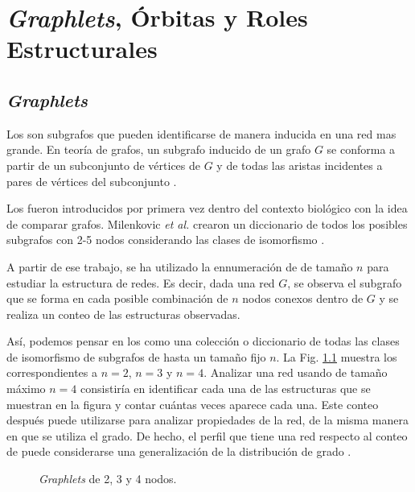 
\chapter{\textit{Graphlets}, Órbitas y Roles Estructurales}
\label{chapter:3}

\section{\textit{Graphlets}}


Los \graphlets son subgrafos que pueden identificarse de manera inducida en una red mas grande.  En teoría de grafos, un subgrafo inducido de un grafo $G$ se conforma a partir de un subconjunto de vértices de $G$ y de todas las aristas incidentes a pares de vértices del subconjunto \cite{przulj_biological_2007}.


Los \graphlets fueron introducidos por primera vez dentro del contexto biológico con la idea de comparar grafos. Milenkovic \textit{et al.} crearon un diccionario de todos los posibles subgrafos con 2-5 nodos considerando las clases de isomorfismo \cite{milenkovic_uncovering_2008}. 

A partir de ese trabajo, se ha utilizado la ennumeración de \graphlets de tamaño $n$ para estudiar la estructura de redes. Es decir, dada una red $G$, se observa el subgrafo que se forma en cada posible combinación de $n$ nodos conexos dentro de $G$ y se realiza un conteo de las estructuras observadas.

Así, podemos pensar en los \graphlets como una colección o diccionario de todas las clases de isomorfismo de subgrafos de hasta un tamaño fijo $n$. La Fig. \ref{fig:small-graphlets} muestra los \graphlets correspondientes a $n=2$, $n=3$ y $n=4$. Analizar una red usando \graphlets de tamaño máximo $n=4$ consistiría en identificar cada una de las estructuras que se muestran en la figura y contar cuántas veces aparece cada una. Este conteo después puede utilizarse para analizar propiedades de la red, de la misma manera en que se utiliza el grado. De hecho, el perfil que tiene una red respecto al conteo de \graphlets puede considerarse una generalización de la distribución de grado \citep{sarajlic_graphlet-based_2016}. 

 \begin{figure}[htbp]
   \centering
   
    \caption{\textit{Graphlets} de 2, 3 y 4 nodos.}
    \label{fig:small-graphlets}
\end{figure} 


